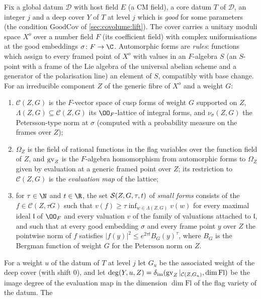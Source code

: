 \begin{definition}\label{pf:covol:def:small}
Fix a global datum $\mathcal D$ with host field $E$ (a CM field), a core datum $T$ of $\mathcal D$, an
integer $j$ and a deep cover $Y$ of $T$ at level $j$ which is \emph{good} for some parameters (the
condition $\mathrm{GoodCov}$ of \cref{sec:covolume:lift}). The cover carries a unitary moduli space $X^o$
over a number field $F$ (its coefficient field) with complex uniformisations at the good embeddings
$\sigma\colon F\to\C$. Automorphic forms are \emph{rules}: functions which assign to every framed point of
$X^o$ with values in an $F$-algebra $S$ (an $S$-point with a frame of the Lie algebra of the universal
abelian scheme and a generator of the polarisation line) an element of $S$, compatibly with base change.
For an irreducible component $Z$ of the generic fibre of $X^o$ and a weight $G$:
\begin{enumerate}[label=(\alph*)]
\item $\mathcal C(Z,G)$ is the $F$-vector space of cusp forms of weight $G$ supported on $Z$,
  $\Lambda(Z,G)\subseteq\mathcal C(Z,G)$ its $\OO_F$-lattice of integral forms, and $\nu_\sigma(Z,G)$ the
  Petersson-type norm at $\sigma$ (computed with a probability measure on the frames over $Z$);
\item $\Omega_Z$ is the field of rational functions in the flag variables over the function field of $Z$,
  and $\operatorname{gv}_Z$ is the $F$-algebra homomorphism from automorphic forms to $\Omega_Z$ given by evaluation
  at a generic framed point over $Z$; its restriction to $\mathcal C(Z,G)$ is the \emph{evaluation map} of
  the lattice;
\item for $\tau\in\N$ and $t\in\R$, the set $\mathcal{S}(Z,G,\tau,t)$ of \emph{small forms} consists of the
  $f\in\mathcal C(Z,\tau G)$ such that $v(f)\ge\tau\inf_{w\in\Lambda(Z,G)}v(w)$ for every maximal ideal
  $\mathfrak l$ of $\OO_F$ and every valuation $v$ of the family of valuations attached to $\mathfrak l$,
  and such that at every good embedding $\sigma$ and every frame point $y$ over $Z$ the pointwise norm of
  $f$ satisfies $|f(y)|^2\le e^{2\tau t}B_G(y)^\tau$, where $B_G$ is the Bergman function of weight $G$ for
  the Petersson norm on $Z$.
\end{enumerate}
For a weight $u$ of the datum of $T$ at level $j$ let $G_u$ be the associated weight of the deep cover
(with shift $0$), and let $\deg(Y,u,Z)=\delta_{\mathrm{im}}(\operatorname{gv}_Z|_{\mathcal C(Z,G_u)},\dim\mathrm{Fl})$ be the
image degree of the evaluation map in the dimension $\dim\mathrm{Fl}$ of the flag variety of the datum. The

\end{definition}
